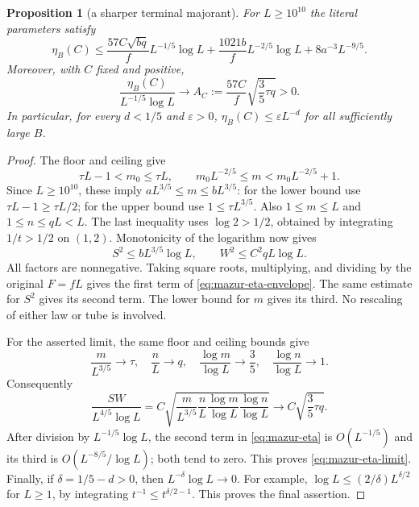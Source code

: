 \documentclass[11pt]{article}
\newtheorem{proposition}{Proposition}
\theoremstyle{remark}\newtheorem{remark}[proposition]{Remark}
\begin{document}
\begin{proposition}[a sharper terminal majorant]
\label{prop:mazur-eta}
For $L\ge10^{10}$ the literal parameters satisfy
\begin{equation}
 \eta_B(C)\le
 \frac{57C\sqrt{bq}}{f}L^{-1/5}\log L+
 \frac{1021b}{f}L^{-2/5}\log L+
 8a^{-3}L^{-9/5}.
 \label{eq:mazur-eta-envelope}
\end{equation}
Moreover, with $C$ fixed and positive,
\begin{equation}
 \frac{\eta_B(C)}{L^{-1/5}\log L}
 \longrightarrow
 A_C:=\frac{57C}{f}\sqrt{\frac35\tau q}>0.
 \label{eq:mazur-eta-limit}
\end{equation}
In particular, for every $d<1/5$ and $\varepsilon>0$,
$\eta_B(C)\le\varepsilon L^{-d}$ for all sufficiently large $B$.
\end{proposition}
\begin{proof}
The floor and ceiling give
\[
 \tau L-1<m_0\le\tau L,\qquad
 m_0L^{-2/5}\le m<m_0L^{-2/5}+1.
\]
Since $L\ge10^{10}$, these imply
$aL^{3/5}\le m\le bL^{3/5}$: for the lower bound use
$\tau L-1\ge\tau L/2$; for the upper bound use
$1\le\tau L^{3/5}$.
Also $1\le m\le L$ and $1\le n\le qL<L$.
The last inequality uses $\log2>1/2$, obtained by integrating
$1/t>1/2$ on $(1,2)$.
Monotonicity of the logarithm now gives
\[
 S^2\le bL^{3/5}\log L,\qquad
 W^2\le C^2qL\log L.
\]
All factors are nonnegative. Taking square roots, multiplying,
and dividing by the original $F=fL$ gives the first term of
\eqref{eq:mazur-eta-envelope}. The same estimate for $S^2$
gives its second term. The lower bound for $m$ gives its third.
No rescaling of either law or tube is involved.

For the asserted limit, the same floor and ceiling bounds give
\[
 \frac m{L^{3/5}}\to\tau,\quad \frac nL\to q,\quad
 \frac{\log m}{\log L}\to\frac35,\quad
 \frac{\log n}{\log L}\to1.
\]
Consequently
\[
 \frac{SW}{L^{4/5}\log L}
 =C\sqrt{\frac m{L^{3/5}}\frac nL
              \frac{\log m}{\log L}\frac{\log n}{\log L}}
 \longrightarrow C\sqrt{\frac35\tau q}.
\]
After division by $L^{-1/5}\log L$, the second term in
\eqref{eq:mazur-eta} is $O(L^{-1/5})$ and its third is
$O(L^{-8/5}/\log L)$; both tend to zero.
This proves \eqref{eq:mazur-eta-limit}.
Finally, if $\delta=1/5-d>0$, then
$L^{-\delta}\log L\to0$. For example,
$\log L\le (2/\delta)L^{\delta/2}$ for $L\ge1$,
by integrating $t^{-1}\le t^{\delta/2-1}$.
This proves the final assertion.
\end{proof}
\end{document}
